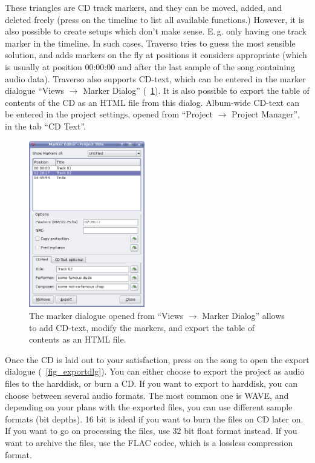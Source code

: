 These triangles are CD track markers, and they can be moved, added, and deleted freely (press  on the timeline to list all available functions.) However, it is also possible to create setups which don't make sense. E.\,g. only having one track marker in the timeline. In such cases, Traverso tries to guess the most sensible solution, and adds markers on the fly at positions it considers appropriate (which is usually at position 00:00:00 and after the last sample of the song containing audio data). Traverso also supports CD-text, which can be entered in the marker dialogue ``Views $\rightarrow$ Marker Dialog'' (\FigB~\ref{fig_marker-editor}). It is also possible to export the table of contents of the CD as an HTML file from this dialog. Album-wide CD-text can be entered in the project settings, opened from ``Project $\rightarrow$ Project Manager'', in the tab ``CD Text''.

\begin{figure}[ht]
 \centering\includegraphics[width=0.45\textwidth]{images/marker-editor}
 \caption{The marker dialogue opened from ``Views $\rightarrow$ Marker Dialog'' allows to add CD-text, modify the markers, and export the table of contents as an HTML file.}
 \label{fig_marker-editor}
\end{figure}

Once the CD is laid out to your satisfaction, press  on the song to open the export dialogue (\FigB~\ref{fig_exportdlg}). You can either choose to export the project as audio files to the harddisk, or burn a CD. If you want to export to harddisk, you can choose between several audio formats. The most common one is WAVE, and depending on your plans with the exported files, you can use different sample formats (bit depths). 16 bit is ideal if you want to burn the files on CD later on. If you want to go on processing the files, use 32 bit float format instead. If you want to archive the files, use the FLAC codec, which is a lossless compression format.

